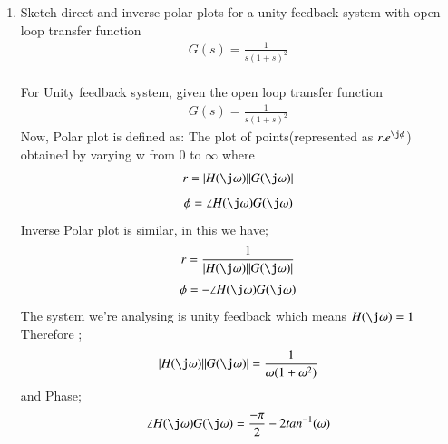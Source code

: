 \begin{enumerate}[label=\thesection.\arabic*.,ref=\thesection.\theenumi]
\item
Sketch direct and inverse polar plots for a unity feedback system with open loop transfer function
\begin{align}
G(s) = \frac{1}{s(1+s)^2}
\end{align}
\\
\solution  
For Unity feedback system, given the open loop transfer function
\begin{align}
G(s) = \frac{1}{s(1+s)^2}
\end{align}
Now, Polar plot is defined as:
The plot of points(represented as $r.e^{\j\phi}$) obtained by varying w from 0 to $\infty$  where 
\begin{align}
r=|H(\j\omega)||G(\j\omega)|
\end{align}
\begin{align}
\phi=\angle H(\j\omega)G(\j\omega)
\end{align}
\linebreak
Inverse Polar plot is similar, in this we have;
\begin{align}
r=\frac{1}{|H(\j\omega)||G(\j\omega)|}
\end{align}
\begin{align}
\phi=-\angle H(\j\omega)G(\j\omega)
\end{align}   
The system we're analysing is unity feedback which means $H(\j\omega) = 1$
Therefore ;
\begin{align}
|H(\j\omega)||G(\j\omega)| = \frac{1}{\omega(1+\omega^2)}
\label{eq:mod_G}
\end{align}
and Phase;
\begin{align}
\angle H(\j\omega)G(\j\omega) = \frac{-\pi}{2} - 2tan^{-1}(\omega)  
\label{eq:phase_G}
\end{align}


\end{enumerate}
